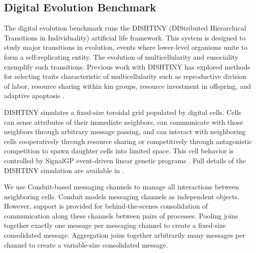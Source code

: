 \subsection{ Digital Evolution Benchmark } \label{sec:digital_evolution_benchmark}

The digital evolution benchmark runs the DISHTINY (DIStributed Hierarchical Transitions in Individuality) artificial life framework.
This system is designed to study major transitions in evolution, events where lower-level organisms unite to form a self-replicating entity.
The evolution of multicellularity and eusociality exemplify such transitions.
Previous work with DISHTINY has explored methods for selecting traits characteristic of multicellularity such as reproductive division of labor, resource sharing within kin groups, resource investment in offspring, and adaptive apoptosis \cite{moreno2019toward}.

DISHTINY simulates a fixed-size toroidal grid populated by digital cells.
Cells can sense attributes of their immediate neighbors, can communicate with those neighbors through arbitrary message passing, and can interact with neighboring cells cooperatively through resource sharing or competitively through antagonistic competition to spawn daughter cells into limited space.
This cell behavior is controlled by SignalGP event-driven linear genetic programs \cite{lalejini2018evolving}.
Full details of the DISHTINY simulation are available in \cite{moreno2021exploring}.

We use Conduit-based messaging channels to manage all interactions between neighboring cells.
Conduit models messaging channels as independent objects.
However, support is provided for behind-the-scenes consolidation of communication along these channels between pairs of processes.
Pooling joins together exactly one message per messaging channel to create a fixed-size consolidated message.
Aggregation joins together arbitrarily many messages per channel to create a variable-size consolidated message.

